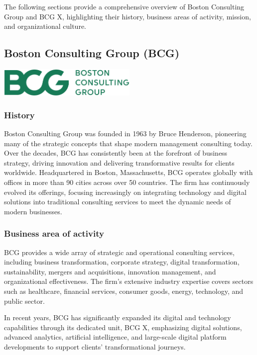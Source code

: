 The following sections provide a comprehensive overview of Boston Consulting Group and BCG X, highlighting their history, business areas of activity, mission, and organizational culture.

\subsection{Boston Consulting Group (BCG)}
\begin{center}
    \centering
    \includegraphics[width=0.5\textwidth]{Images/Boston-Consulting-Group-Logo.jpg}
     \cite{O-History}
    \label{fig:oracle}
\end{center}

\subsubsection{History}
Boston Consulting Group was founded in 1963 by Bruce Henderson, pioneering many of the strategic concepts that shape modern management consulting today. Over the decades, BCG has consistently been at the forefront of business strategy, driving innovation and delivering transformative results for clients worldwide. Headquartered in Boston, Massachusetts, BCG operates globally with offices in more than 90 cities across over 50 countries. The firm has continuously evolved its offerings, focusing increasingly on integrating technology and digital solutions into traditional consulting services to meet the dynamic needs of modern businesses.

\subsubsection{Business area of activity}
BCG provides a wide array of strategic and operational consulting services, including business transformation, corporate strategy, digital transformation, sustainability, mergers and acquisitions, innovation management, and organizational effectiveness. The firm's extensive industry expertise covers sectors such as healthcare, financial services, consumer goods, energy, technology, and public sector.\mynewline

In recent years, BCG has significantly expanded its digital and technology capabilities through its dedicated unit, BCG X, emphasizing digital solutions, advanced analytics, artificial intelligence, and large-scale digital platform developments to support clients' transformational journeys.

